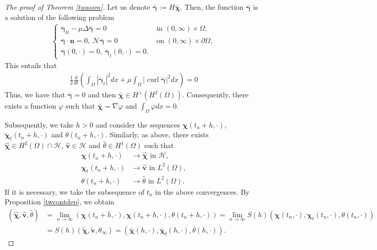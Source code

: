 \documentclass[11pt]{article}
\numberwithin{equation}{section}
\theoremstyle{plain}
\newcommand\bb[1]{\mathbf{#1}}
\newcommand{\tn}{\Omega}
\newcommand{\io}{\int_{\Omega}}
\newcommand{\htwo}{H^2(\Omega)}
\renewcommand{\hom}{H^1(\tn)}
\newcommand{\ld}{L^2(\Omega)}
\newcommand{\ul}{\frac{1}{2}}
\newcommand{\ddt}{\frac{d}{dt}}
\newcommand{\hp}{H^{\perp}}
\DeclareMathOperator{\curl}{curl}
\let \phi\varphi
\newcommand{\ot}{(0,\infty)\times\Omega}
\newcommand{\bs}[1]{\boldsymbol{#1}}
\newcommand{\N}{\mathcal{N}}
\renewcommand{\H}{\mathcal{H}}
\begin{document}
\begin{proof}[The proof of Theorem \ref{twassm}]
Let us denote $\bar{\bs\gamma}:=H\bar{\bs\chi}$. Then, the function $\bar{\bs\gamma}$ is a solution of the following problem
\begin{align*}
\begin{cases}
\bar{\bs\gamma}_{tt}-\mu\Delta\bar{\bs\gamma}=0 &\text{ in }\ot,\\
\bar{\bs\gamma}\cdot\bb n=0,\ \N\bar{\bs\gamma}=0 &\text{ on } (0,\infty)\times\partial\Omega,\\
\bar{\bs\gamma}(0,\cdot)=0,\ \bar{\bs\gamma}_t(0,\cdot)=0.
\end{cases}
\end{align*}
This entails that
\begin{align*}
\ul\ddt\left(\io|\bar{\bs\gamma}_t|^2dx+\mu\io|\curl\bar{\bs\gamma}|^2dx\right)=0
\end{align*}
Thus, we have that $\bar{\bs\gamma}=0$ and then $\bar{\bs\chi}\in\hp(\htwo)$. Consequently, there exists a function $\phi$ such that $\bar{\bs\chi}=\nabla\phi$ and $\io\phi dx=0$.

Subsequently, we take $h>0$ and consider the sequences $\bs\chi(t_n+h,\cdot)$, $\bs\chi_t(t_n+h,\cdot)$ and $\theta(t_n+h,\cdot)$. Similarly, as above, there exists
$\hat{\bs\chi}\in\htwo\cap\H$, $\hat{\bb v}\in\H$ and $\hat\theta\in\hom$ such that
\begin{align*}
\bs\chi(t_n+h,\cdot)&\to \hat{\bs\chi}\textrm{ in }\H,\\
\bs\chi_t(t_n+h,\cdot)&\to\hat{\bb v}\textrm{ in }\ld,\\
\theta(t_n+h,\cdot)&\to\hat{\theta}\textrm{ in }\ld.
\end{align*}
If it is necessary, we take the subsequence of $t_n$ in the above convergences. By Proposition \ref{twcontdep}, we obtain
\begin{align*}
(\hat{\bs\chi},\hat{\bb
v},\hat\theta)&=\lim_{n\to\infty}(\bs\chi(t_n+h,\cdot),\bs\chi(t_n+h,\cdot),\theta(t_n+h,\cdot))=\lim_{n\to\infty}S(h)(\bs\chi(t_n,\cdot),\bs\chi_t(t_n,\cdot),\theta(t_n,\cdot))\\
&=S(h)(\tilde{\bs\chi},\tilde{\bb v},\theta_{\infty})=(\bar{\bs\chi}(h,\cdot),\bar{\bs\chi}_t(h,\cdot),\bar\theta(h,\cdot)).
\end{align*}


\end{proof}
\end{document}
